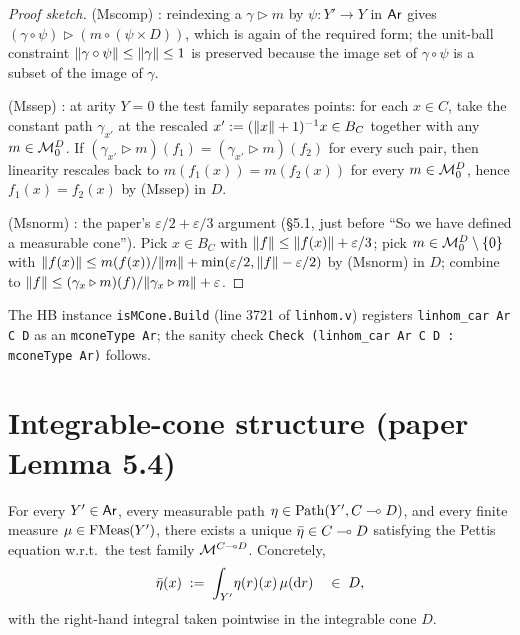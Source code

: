 \begin{proof}[Proof sketch]
(Mscomp) : reindexing
a $\gamma \triangleright m$ by $\psi : Y' \to Y$ in $\mathsf{Ar}$ gives
$(\gamma \circ \psi) \triangleright (m \circ (\psi \times D))$,
which is again of the required form; the unit-ball constraint
$\lVert \gamma \circ \psi \rVert \le \lVert \gamma \rVert \le 1$ is preserved
because the image set of $\gamma \circ \psi$ is a subset of the
image of $\gamma$.

(Mssep) : at arity
$Y = 0$ the test family separates points: for each $x \in C$, take
the constant path $\gamma_{x'}$ at the rescaled
$x' := (\lVert x \rVert + 1)^{-1} x \in B_C$ together with any
$m \in \mathcal{M}_0^D$. If $(\gamma_{x'} \triangleright m)(f_1) =
(\gamma_{x'} \triangleright m)(f_2)$ for every such pair, then
linearity rescales back to $m(f_1(x)) = m(f_2(x))$ for every
$m \in \mathcal{M}_0^D$, hence $f_1(x) = f_2(x)$ by (Mssep) in $D$.

(Msnorm) : the paper's
$\varepsilon/2 + \varepsilon/3$ argument
(\S5.1, just before ``So we have defined a measurable cone'').
Pick $x \in B_C$ with $\lVert f \rVert \le \lVert f(x) \rVert + \varepsilon/3$;
pick $m \in \mathcal{M}_0^D \setminus \{0\}$ with
$\lVert f(x) \rVert \le m(f(x))/\lVert m \rVert + \min(\varepsilon/2,
\lVert f \rVert - \varepsilon/2)$ by (Msnorm) in $D$; combine to
$\lVert f \rVert \le (\gamma_x \triangleright m)(f) / \lVert \gamma_x
\triangleright m \rVert + \varepsilon$.
\end{proof}

The HB instance \texttt{isMCone.Build} (line 3721 of
\texttt{linhom.v}) registers \texttt{linhom\_car Ar C D} as an
\texttt{mconeType Ar}; the sanity check
\verb|Check (linhom_car Ar C D : mconeType Ar)| follows.

\section{Integrable-cone structure (paper Lemma 5.4)}%
\label{sec:linhom-icone}

\begin{lemma}
\label{lem:linhom-icone}
\rocqok
{}
For every $Y' \in \mathsf{Ar}$, every measurable path
$\eta \in \mathrm{Path}(Y', C \multimap D)$, and every finite measure $\mu \in
\mathrm{FMeas}(Y')$, there exists a unique $\bar\eta \in C \multimap D$
satisfying the Pettis equation w.r.t.\ the test family
$\mathcal{M}^{C \multimap D}$. Concretely,
\[
  \bar\eta(x) \;:=\; \int_{Y'}\! \eta(r)(x)\,\mu(\mathrm dr)
  \quad\in\; D,
\]
with the right-hand integral taken pointwise in the integrable
cone $D$.
\end{lemma}

